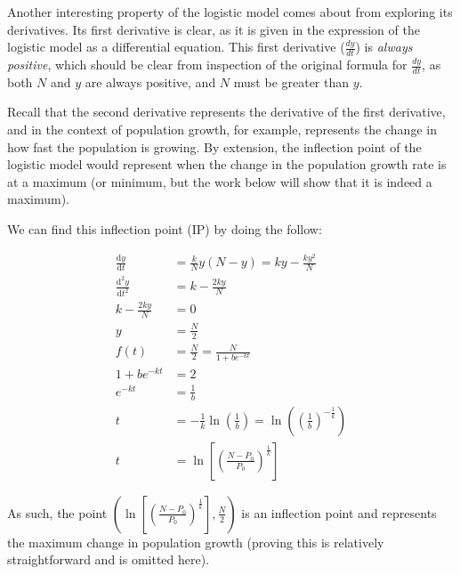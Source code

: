 \documentclass[12pt]{article}
\begin{document}
\begin{itemize}
    Another interesting property of the logistic model comes about from exploring its derivatives. Its first derivative is clear, as it is given in the expression of the logistic model as a differential equation. This first derivative ($\frac{dy}{dt}$) is \textit{always positive}, which should be clear from inspection of the original formula for $\frac{dy}{dt}$, as both $N$ and $y$ are always positive, and $N$ must be greater than $y$.

    Recall that the second derivative represents the derivative of the first derivative, and in the context of population growth, for example, represents the change in how fast the population is growing. By extension, the inflection point of the logistic model would represent when the change in the population growth rate is at a maximum (or minimum, but the work below will show that it is indeed a maximum).

    We can find this inflection point (IP) by doing the follow:

    \begin{equation}
        \begin{split}
            \frac{\text{d}y}{\text{d}t} &= \frac{k}{N}y(N-y) = ky - \frac{ky^2}{N}\\
            \frac{\text{d}^2y}{\text{d}t^2} &= k - \frac{2ky}{N}\\
            k - \frac{2ky}{N} &= 0\\
            y &= \frac{N}{2}\\
            f(t) &= \frac{N}{2} = \frac{N}{1+be^{-kt}}\\
            1+be^{-kt} &= 2\\
            e^{-kt} &= \frac{1}{b}\\
            t &= -\frac{1}{k}\ln(\frac{1}{b}) = \ln((\frac{1}{b})^{-\frac{1}{k}})\\
            t &= \ln\left[(\frac{N-P_0}{P_0})^{\frac{1}{k}}\right]
        \end{split}
    \end{equation}

    As such, the point $(\ln[(\frac{N-P_0}{P_0})^{\frac{1}{k}}],\frac{N}{2})$ is an inflection point and represents the maximum change in population growth (proving this is relatively straightforward and is omitted here).


\end{itemize}
\end{document}

